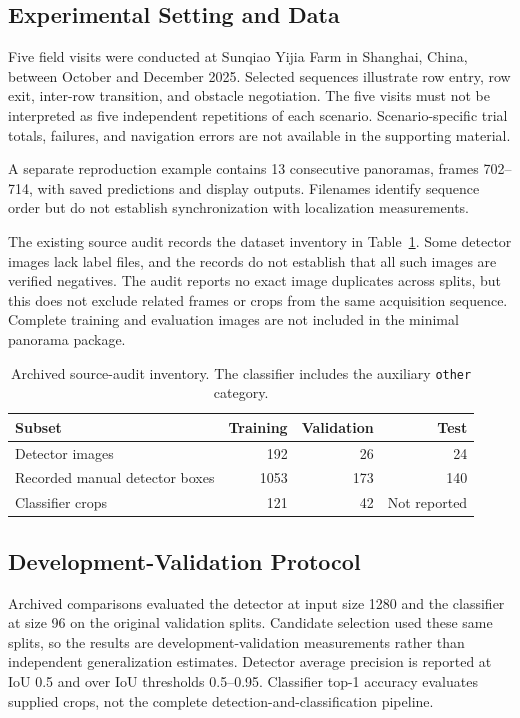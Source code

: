 \documentclass[agriengineering,article,submit,pdftex,moreauthors]{Definitions/mdpi}
\begin{document}
\subsection{Experimental Setting and Data}
Five field visits were conducted at Sunqiao Yijia Farm in Shanghai, China, between October and December 2025. Selected sequences illustrate row entry, row exit, inter-row transition, and obstacle negotiation. The five visits must not be interpreted as five independent repetitions of each scenario. Scenario-specific trial totals, failures, and navigation errors are not available in the supporting material.

A separate reproduction example contains 13 consecutive panoramas, frames 702--714, with saved predictions and display outputs. Filenames identify sequence order but do not establish synchronization with localization measurements.

The existing source audit records the dataset inventory in Table~\ref{tab:data}. Some detector images lack label files, and the records do not establish that all such images are verified negatives. The audit reports no exact image duplicates across splits, but this does not exclude related frames or crops from the same acquisition sequence. Complete training and evaluation images are not included in the minimal panorama package.
\begin{table}[H]
\caption{Archived source-audit inventory. The classifier includes the auxiliary \texttt{other} category.}
\centering
\begin{tabular}{lrrr}
\toprule
Subset & Training & Validation & Test\\
\midrule
Detector images & 192 & 26 & 24\\
Recorded manual detector boxes & 1053 & 173 & 140\\
Classifier crops & 121 & 42 & Not reported\\
\bottomrule
\end{tabular}
\label{tab:data}
\end{table}

\subsection{Development-Validation Protocol}
Archived comparisons evaluated the detector at input size 1280 and the classifier at size 96 on the original validation splits. Candidate selection used these same splits, so the results are development-validation measurements rather than independent generalization estimates. Detector average precision is reported at IoU 0.5 and over IoU thresholds 0.5--0.95. Classifier top-1 accuracy evaluates supplied crops, not the complete detection-and-classification pipeline.
\end{document}
